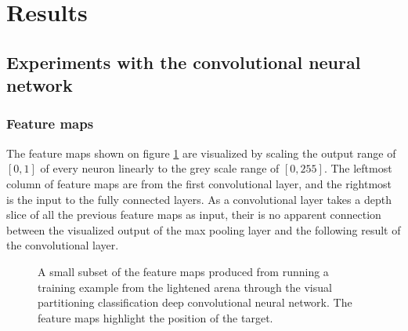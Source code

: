 
\section{Results}
\label{sec:results}

\subsection{Experiments with the convolutional neural network}


\subsubsection{Feature maps}
The feature maps shown on figure \ref{fig:featuremaps} are visualized by scaling the output range of $[0,1]$ of every neuron linearly to the grey scale range of $[0,255]$. The leftmost column of feature maps are from the first convolutional layer, and the rightmost is the input to the fully connected layers. As a convolutional layer takes a depth slice of all the previous feature maps as input, their is no apparent connection between the visualized output of the max pooling layer and the following result of the convolutional layer.

\begin{figure}[H]
	\begin{scriptsize}
		\sffamily
		\def\svgwidth{\textwidth}
		
	\end{scriptsize}
	\caption{A small subset of the feature maps produced from running a training example from the lightened arena through the visual partitioning classification deep convolutional neural network. The feature maps highlight the position of the target.}
	\label{fig:featuremaps}
\end{figure}


%
%
%
%
%
